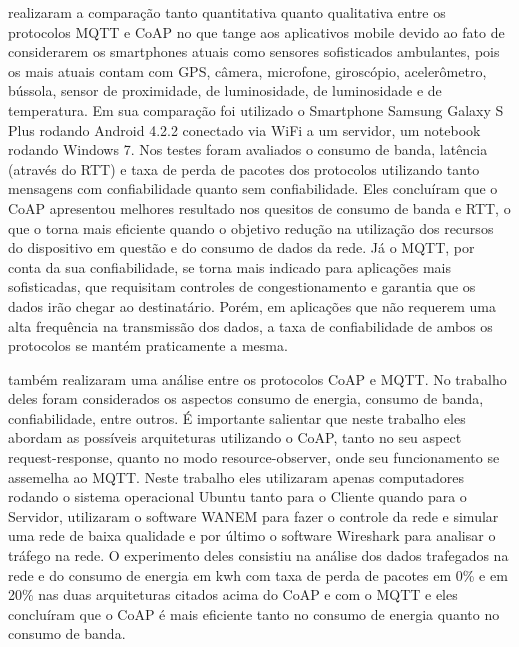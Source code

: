 \cite{deCaro2013comparison} realizaram a comparação tanto quantitativa quanto qualitativa entre os protocolos MQTT e CoAP no que tange aos aplicativos mobile devido ao fato de considerarem os smartphones atuais como sensores sofisticados ambulantes, pois os mais atuais contam com GPS, câmera, microfone, giroscópio, acelerômetro, bússola, sensor de proximidade, de luminosidade, de luminosidade e de temperatura.
Em sua comparação foi utilizado o Smartphone Samsung Galaxy S Plus rodando Android 4.2.2 conectado via WiFi a um servidor, um notebook rodando Windows 7.
Nos testes foram avaliados o consumo de banda, latência (através do RTT) e taxa de perda de pacotes dos protocolos utilizando tanto mensagens com confiabilidade quanto sem confiabilidade.
Eles concluíram que o CoAP apresentou melhores resultado nos quesitos de consumo de banda e RTT, o que o torna mais eficiente quando o objetivo redução na utilização dos recursos do dispositivo em questão e do consumo de dados da rede. Já o MQTT, por conta da sua confiabilidade, se torna mais indicado para aplicações mais sofisticadas, que requisitam controles de congestionamento e garantia que os dados irão chegar ao destinatário. Porém, em aplicações que não requerem uma alta frequência na transmissão dos dados, a taxa de confiabilidade de ambos os protocolos se mantém praticamente a mesma.

\cite{bandyopadhyay2013lightweight} também realizaram uma análise entre os protocolos CoAP e MQTT. No trabalho deles foram considerados os aspectos consumo de energia, consumo de banda, confiabilidade, entre outros. É importante salientar que neste trabalho eles abordam as possíveis arquiteturas utilizando o CoAP, tanto no seu aspect request-response, quanto no modo resource-observer, onde seu funcionamento se assemelha ao MQTT. Neste trabalho eles utilizaram apenas computadores rodando o sistema operacional Ubuntu tanto para o Cliente quando para o Servidor, utilizaram o software WANEM para fazer o controle da rede e simular uma rede de baixa qualidade e por último o software Wireshark para analisar o tráfego na rede. O experimento deles consistiu na análise dos dados trafegados na rede e do consumo de energia em kwh com taxa de perda de pacotes em 0\% e em 20\% nas duas arquiteturas citados acima do CoAP e com o MQTT e eles concluíram que o CoAP é mais eficiente tanto no consumo de energia quanto no consumo de banda.

